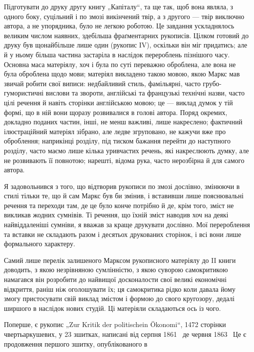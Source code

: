 
Підготувати до друку другу книгу „Капіталу“, та ще так, щоб вона
являла, з одного боку, суцільний і по змозі викінчений твір, а з другого
— твір виключно автора, а не упорядника, було не легкою роботою.
Це завдання ускладнялось великим числом наявних, здебільша фраґментарних
рукописів. Цілком готовий до друку був щонайбільше лише один
(рукопис IV), оскільки він міг придатись; але й у ньому більша частина
застаріла в наслідок перероблень пізнішого часу. Основна маса матеріялу,
хоч і була по суті переважно оброблена, але вона не була оброблена щодо
мови; матеріял викладено такою мовою, якою Маркс мав звичай робити свої
виписи: недбайливий стиль, фамільярні, часто грубо-гумористичні вислови
та звороти, англійські та французькі технічні назви, часто цілі речення
й навіть сторінки англійською мовою; це — виклад думок у тій формі,
що в ній вони щоразу розвивалися в голові автора. Поряд окремих,
докладно поданих частин, інші, не менш важливі, лише накреслено; фактичний
ілюстраційний матеріял зібрано, але ледве згруповано, не кажучи
вже про оброблення; наприкінці розділу, під тиском бажання перейти до
наступного розділу, часто маємо лише кілька уривчастих речень, які накреслюють
думку, але не розвивають її повнотою; нарешті, відома рука,
часто нерозбірна й для самого автора.

Я задовольнився з того, що відтворив рукописи по змозі дослівно,
змінюючи в стилі тільки те, що й сам Маркс був би змінив, і вставивши
лише пояснювальні речення та переходи там, де це було конче потрібно
й де, крім того, зміст не викликав жодних сумнівів. Ті речення, що їхній
зміст наводив хоч на деякі найвіддаленіші сумніви, я вважав за краще
друкувати дослівно. Мої перероблення та вставки не складають разом і
десятьох друкованих сторінок, і всі вони лише формального характеру.

Самий лише перелік залишеного Марксом рукописного матеріялу до
II книги доводить, з якою незрівняною сумлінністю, з якою суворою
самокритикою намагався він розробити до найвищої досконалости свої
великі економічні відкриття, раніш ніж оголошувати їх; ця самокритика
рідко коли давала йому змогу пристосувати свій виклад змістом і формою
до свого кругозору, дедалі ширшого в наслідок нових студій. Ці
матеріяли складаються ось із чого.

Поперше, є рукопис „Zur Kritik der politischein Ökonomi“, 1472 сторінки
чвертьаркушевих, у 23 зшитках, написані від серпня 1861~ де
червня 1863~ Це є продовження першого зшитку, опублікованого в
\parbreak{}  %
